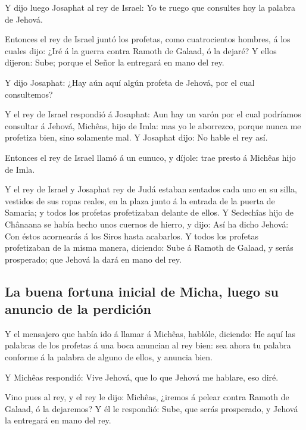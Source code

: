  Y dijo luego Josaphat al rey de Israel: Yo te ruego que
consultes hoy la palabra de Jehová.

 Entonces el rey de Israel juntó los profetas, como
cuatrocientos hombres, á los cuales dijo: ¿Iré á la guerra contra Ramoth
de Galaad, ó la dejaré? Y ellos dijeron: Sube; porque el Señor la
entregará en mano del rey.

 Y dijo Josaphat: ¿Hay aún aquí algún profeta de Jehová, por
el cual consultemos?

 Y el rey de Israel respondió á Josaphat: Aun hay un varón
por el cual podríamos consultar á Jehová, Michêas, hijo de Imla: mas yo
le aborrezco, porque nunca me profetiza bien, sino solamente mal. Y
Josaphat dijo: No hable el rey así.

 Entonces el rey de Israel llamó á un eunuco, y díjole: trae
presto á Michêas hijo de Imla.

 Y el rey de Israel y Josaphat rey de Judá estaban sentados
cada uno en su silla, vestidos de sus ropas reales, en la plaza junto á
la entrada de la puerta de Samaria; y todos los profetas profetizaban
delante de ellos.  Y Sedechîas hijo de Chânaana se había
hecho unos cuernos de hierro, y dijo: Así ha dicho Jehová: Con éstos
acornearás á los Siros hasta acabarlos.  Y todos los
profetas profetizaban de la misma manera, diciendo: Sube á Ramoth de
Galaad, y serás prosperado; que Jehová la dará en mano del rey.

\hypertarget{la-buena-fortuna-inicial-de-micha-luego-su-anuncio-de-la-perdiciuxf3n}{%
\subsection{La buena fortuna inicial de Micha, luego su anuncio de la
perdición}\label{la-buena-fortuna-inicial-de-micha-luego-su-anuncio-de-la-perdiciuxf3n}}

 Y el mensajero que había ido á llamar á Michêas, hablóle,
diciendo: He aquí las palabras de los profetas á una boca anuncian al
rey bien: sea ahora tu palabra conforme á la palabra de alguno de ellos,
y anuncia bien.

 Y Michêas respondió: Vive Jehová, que lo que Jehová me
hablare, eso diré.

 Vino pues al rey, y el rey le dijo: Michêas, ¿iremos á
pelear contra Ramoth de Galaad, ó la dejaremos? Y él le respondió: Sube,
que serás prosperado, y Jehová la entregará en mano del rey.


